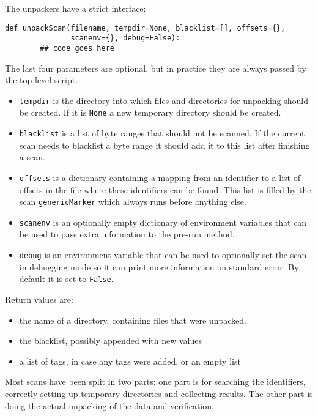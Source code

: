 \documentclass[10pt]{article}
\begin{document}
The unpackers have a strict interface:

\begin{verbatim}
def unpackScan(filename, tempdir=None, blacklist=[], offsets={},
               scanenv={}, debug=False):
        ## code goes here
\end{verbatim}

The last four parameters are optional, but in practice they are always passed
by the top level script.

\begin{itemize}
\item \texttt{tempdir} is the directory into which files and directories for
unpacking should be created. If it is \texttt{None} a new temporary directory
should be created.
\item \texttt{blacklist} is a list of byte ranges that should not be scanned.
If the current scan needs to blacklist a byte range it should add it to this
list after finishing a scan.
\item \texttt{offsets} is a dictionary containing a mapping from an identifier
to a list of offsets in the file where these identifiers can be found. This
list is filled by the scan \texttt{genericMarker} which always runs before
anything else.
\item \texttt{scanenv} is an optionally empty dictionary of environment variables
that can be used to pass extra information to the pre-run method.
\item \texttt{debug} is an environment variable that can be used to optionally
set the scan in debugging mode so it can print more information on standard
error. By default it is set to \texttt{False}.
\end{itemize}

Return values are:

\begin{itemize}
\item the name of a directory, containing files that were unpacked.
\item the blacklist, possibly appended with new values
\item a list of tags, in case any tags were added, or an empty list
\end{itemize}

Most scans have been split in two parts: one part is for searching the
identifiers, correctly setting up temporary directories and collecting results.
The other part is doing the actual unpacking of the data and verification.
\end{document}
